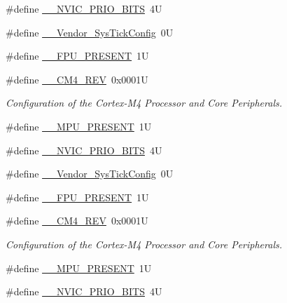 \begin{DoxyCompactItemize}
\item 
\#define \hyperlink{group___configuration__section__for___c_m_s_i_s_gae3fe3587d5100c787e02102ce3944460}{\+\_\+\+\_\+\+N\+V\+I\+C\+\_\+\+P\+R\+I\+O\+\_\+\+B\+I\+TS}~4U
\item 
\#define \hyperlink{group___configuration__section__for___c_m_s_i_s_gab58771b4ec03f9bdddc84770f7c95c68}{\+\_\+\+\_\+\+Vendor\+\_\+\+Sys\+Tick\+Config}~0U
\item 
\#define \hyperlink{group___configuration__section__for___c_m_s_i_s_gac1ba8a48ca926bddc88be9bfd7d42641}{\+\_\+\+\_\+\+F\+P\+U\+\_\+\+P\+R\+E\+S\+E\+NT}~1U
\item 
\#define \hyperlink{group___configuration__section__for___c_m_s_i_s_ga45a97e4bb8b6ce7c334acc5f45ace3ba}{\+\_\+\+\_\+\+C\+M4\+\_\+\+R\+EV}~0x0001U
\begin{DoxyCompactList}\small\item\em Configuration of the Cortex-\/\+M4 Processor and Core Peripherals. \end{DoxyCompactList}\item 
\#define \hyperlink{group___configuration__section__for___c_m_s_i_s_ga4127d1b31aaf336fab3d7329d117f448}{\+\_\+\+\_\+\+M\+P\+U\+\_\+\+P\+R\+E\+S\+E\+NT}~1U
\item 
\#define \hyperlink{group___configuration__section__for___c_m_s_i_s_gae3fe3587d5100c787e02102ce3944460}{\+\_\+\+\_\+\+N\+V\+I\+C\+\_\+\+P\+R\+I\+O\+\_\+\+B\+I\+TS}~4U
\item 
\#define \hyperlink{group___configuration__section__for___c_m_s_i_s_gab58771b4ec03f9bdddc84770f7c95c68}{\+\_\+\+\_\+\+Vendor\+\_\+\+Sys\+Tick\+Config}~0U
\item 
\#define \hyperlink{group___configuration__section__for___c_m_s_i_s_gac1ba8a48ca926bddc88be9bfd7d42641}{\+\_\+\+\_\+\+F\+P\+U\+\_\+\+P\+R\+E\+S\+E\+NT}~1U
\item 
\#define \hyperlink{group___configuration__section__for___c_m_s_i_s_ga45a97e4bb8b6ce7c334acc5f45ace3ba}{\+\_\+\+\_\+\+C\+M4\+\_\+\+R\+EV}~0x0001U
\begin{DoxyCompactList}\small\item\em Configuration of the Cortex-\/\+M4 Processor and Core Peripherals. \end{DoxyCompactList}\item 
\#define \hyperlink{group___configuration__section__for___c_m_s_i_s_ga4127d1b31aaf336fab3d7329d117f448}{\+\_\+\+\_\+\+M\+P\+U\+\_\+\+P\+R\+E\+S\+E\+NT}~1U
\item 
\#define \hyperlink{group___configuration__section__for___c_m_s_i_s_gae3fe3587d5100c787e02102ce3944460}{\+\_\+\+\_\+\+N\+V\+I\+C\+\_\+\+P\+R\+I\+O\+\_\+\+B\+I\+TS}~4U

\end{DoxyCompactItemize}

